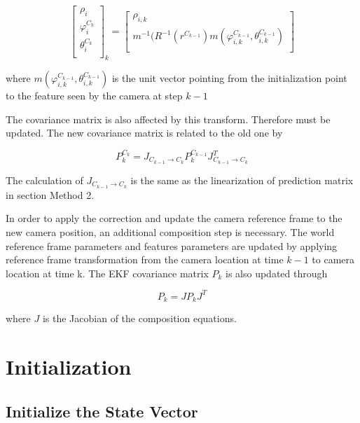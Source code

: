 \begin{equation}
\begin{bmatrix}
\rho_{i} \\
\varphi_{i}^{C_{k}} \\
\theta_{i}^{C_{k}} \\
\end{bmatrix}_{k}=
\begin{bmatrix}
\rho _{i, k} \\
m^{-1}(R^{-1}(r^{C_{k-1}})m(\varphi _{i, k}^{C_{k-1}}, \theta _{i, k}^{C_{k-1}}) \\
\end{bmatrix}
\end{equation}

\noindent where $m(\varphi_{i, k}^{C_{k-1}}, \theta_{i, k}^{C_{k-1}})$ is the 
unit vector pointing from the initialization point to the feature seen 
by the camera at step $k-1$

The covariance matrix is also affected by this transform. Therefore must 
be updated. The new covariance matrix is related to the old one by 

\begin{equation}
P_{k}^{C_{k}}=J_{C_{k-1}\to C_{k}}P_{k}^{C_{k-1}}J_{C_{k-1}\to C_{k}}^{T}
\end{equation}

The calculation of $J_{C_{k-1}\to C_{k}}$ is the same as the 
linearization of prediction matrix in section Method 2.

In order to apply the correction and update the camera reference frame
to the new camera position, an additional composition step is
necessary. The world reference frame parameters and features
parameters are updated by applying reference frame transformation from
the camera location at time $k-1$ to camera location at time k. The
EKF covariance matrix $P_{k}$ is also updated through

\begin{equation}
P_{k}=JP_{k}J^{T}
\end{equation}

\noindent where $J$ is the Jacobian of the composition equations. 
\section{Initialization}
\subsection{Initialize the State Vector}

